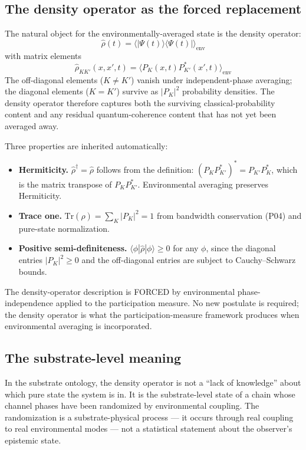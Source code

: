 \documentclass[11pt,a4paper]{article}
\begin{document}
\subsection{The density operator as the forced replacement}

The natural object for the environmentally-averaged state is the density operator:
\[
\hat\rho(t) = \langle|\Psi(t)\rangle\langle\Psi(t)|\rangle_{\mathrm{env}}
\]
with matrix elements
\[
\hat\rho_{KK'}(x, x', t) = \langle P_K(x, t) P_{K'}^*(x', t)\rangle_{\mathrm{env}}
\]
The off-diagonal elements ($K \neq K'$) vanish under independent-phase averaging; the diagonal elements ($K = K'$) survive as $|P_K|^2$ probability densities. The density operator therefore captures both the surviving classical-probability content and any residual quantum-coherence content that has not yet been averaged away.

Three properties are inherited automatically:

\begin{itemize}[noitemsep]
  \item \textbf{Hermiticity.} $\hat\rho^\dagger = \hat\rho$ follows from the definition: $(P_K P_{K'}^*)^* = P_{K'} P_K^*$, which is the matrix transpose of $P_K P_{K'}^*$. Environmental averaging preserves Hermiticity.
  \item \textbf{Trace one.} $\mathrm{Tr}(\hat\rho) = \sum_K |P_K|^2 = 1$ from bandwidth conservation (P04) and pure-state normalization.
  \item \textbf{Positive semi-definiteness.} $\langle\phi|\hat\rho|\phi\rangle \geq 0$ for any $\phi$, since the diagonal entries $|P_K|^2 \geq 0$ and the off-diagonal entries are subject to Cauchy--Schwarz bounds.
\end{itemize}

The density-operator description is FORCED by environmental phase-independence applied to the participation measure. No new postulate is required; the density operator is what the participation-measure framework produces when environmental averaging is incorporated.

\subsection{The substrate-level meaning}

In the substrate ontology, the density operator is not a ``lack of knowledge'' about which pure state the system is in. It is the substrate-level state of a chain whose channel phases have been randomized by environmental coupling. The randomization is a substrate-physical process --- it occurs through real coupling to real environmental modes --- not a statistical statement about the observer's epistemic state.
\end{document}

